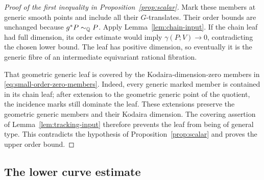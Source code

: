 \begin{proof}[Proof of the first inequality in Proposition~\ref{prop:scalar}]
Mark these members at generic smooth points and include all their
$G$-translates.  Their order bounds are unchanged because
$g^*P\sim_{\mathbb Q}P$.  Apply Lemma~\ref{lem:chain-input}.  If the
chain leaf had full dimension, its order estimate would imply
$\gamma(P;V)\to0$, contradicting the chosen lower bound.  The
leaf has positive dimension, so eventually it is the generic
fibre of an intermediate equivariant rational fibration.

That geometric generic leaf is covered by the Kodaira-dimension-zero
members in \eqref{eq:small-order-zero-members}.  Indeed, every
generic marked member is contained in its chain leaf; after
extension to the geometric generic point of the quotient, the incidence
marks still dominate the leaf.  These extensions preserve the
geometric generic members and their Kodaira dimension.  The
covering assertion of Lemma~\ref{lem:tracking-input} therefore
prevents the leaf from being of general type.  This contradicts
the hypothesis of Proposition~\ref{prop:scalar} and proves the
upper order bound.
\end{proof}

\subsection{The lower curve estimate}

